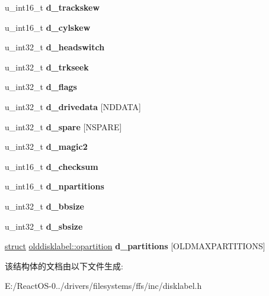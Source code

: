 \begin{DoxyCompactItemize}
\mbox{\label{structolddisklabel_aa7b6261963c40395bc99d9992c61a8b7}} 
u\+\_\+int16\+\_\+t {\bfseries d\+\_\+trackskew}
\item 
\mbox{\label{structolddisklabel_ad3aecc1a5396e25b36e1d593dd694c1d}} 
u\+\_\+int16\+\_\+t {\bfseries d\+\_\+cylskew}
\item 
\mbox{\label{structolddisklabel_a6ceb02fdb08674cc077c498d9257b631}} 
u\+\_\+int32\+\_\+t {\bfseries d\+\_\+headswitch}
\item 
\mbox{\label{structolddisklabel_ad23f80ee6801559b1f9be6419bcced2d}} 
u\+\_\+int32\+\_\+t {\bfseries d\+\_\+trkseek}
\item 
\mbox{\label{structolddisklabel_a7641ed8b156f909132f1ea394ad5852e}} 
u\+\_\+int32\+\_\+t {\bfseries d\+\_\+flags}
\item 
\mbox{\label{structolddisklabel_aae17bbf2cfb50cd0ee11ebdec352382e}} 
u\+\_\+int32\+\_\+t {\bfseries d\+\_\+drivedata} \mbox{[}N\+D\+D\+A\+TA\mbox{]}
\item 
\mbox{\label{structolddisklabel_a09179a8de8cf68a846d60f7b5c2b5655}} 
u\+\_\+int32\+\_\+t {\bfseries d\+\_\+spare} \mbox{[}N\+S\+P\+A\+RE\mbox{]}
\item 
\mbox{\label{structolddisklabel_aeb7a30af33a2a7421cf503dd636b4a48}} 
u\+\_\+int32\+\_\+t {\bfseries d\+\_\+magic2}
\item 
\mbox{\label{structolddisklabel_a03e3be28997a9057ac43132777aa83fb}} 
u\+\_\+int16\+\_\+t {\bfseries d\+\_\+checksum}
\item 
\mbox{\label{structolddisklabel_abda4ec2418c8c8860252ff4da893d719}} 
u\+\_\+int16\+\_\+t {\bfseries d\+\_\+npartitions}
\item 
\mbox{\label{structolddisklabel_a5ce742a58389f2833130890ab0190a91}} 
u\+\_\+int32\+\_\+t {\bfseries d\+\_\+bbsize}
\item 
\mbox{\label{structolddisklabel_adef41361190b3575622e3bf9006956dd}} 
u\+\_\+int32\+\_\+t {\bfseries d\+\_\+sbsize}
\item 
\mbox{\label{structolddisklabel_a61330cb1180e75ca82a756455082edad}} 
\hyperlink{interfacestruct}{struct} \hyperlink{structolddisklabel_1_1opartition}{olddisklabel\+::opartition} {\bfseries d\+\_\+partitions} \mbox{[}O\+L\+D\+M\+A\+X\+P\+A\+R\+T\+I\+T\+I\+O\+NS\mbox{]}
\end{DoxyCompactItemize}


该结构体的文档由以下文件生成\+:\begin{DoxyCompactItemize}
\item 
E\+:/\+React\+O\+S-\/0../drivers/filesystems/ffs/inc/disklabel.\+h\end{DoxyCompactItemize}
